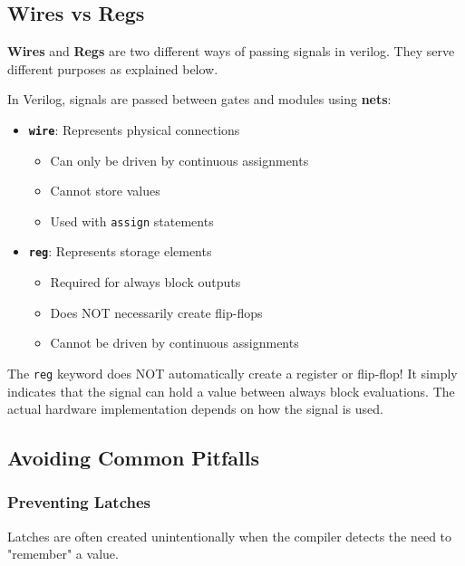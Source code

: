 \documentclass[12pt]{labmanual}
\begin{document}
\subsection{Wires vs Regs}
\textbf{Wires} and \textbf{Regs} are two different ways of passing signals in verilog. They serve different purposes as explained below.
\begin{important}[frametitle={Understanding Nets}]
In Verilog, signals are passed between gates and modules using \textbf{nets}:
\begin{itemize}
    \item \textbf{\texttt{wire}}: Represents physical connections
    \begin{itemize}
        \item Can only be driven by continuous assignments
        \item Cannot store values
        \item Used with \texttt{assign} statements
    \end{itemize}
    \item \textbf{\texttt{reg}}: Represents storage elements
    \begin{itemize}
        \item Required for always block outputs
        \item Does NOT necessarily create flip-flops
        \item Cannot be driven by continuous assignments
    \end{itemize}
\end{itemize}
\end{important}

\begin{extra}[frametitle={Common Misconception}]
The \texttt{reg} keyword does NOT automatically create a register or flip-flop! It simply indicates that the signal can hold a value between always block evaluations. The actual hardware implementation depends on how the signal is used.
\end{extra}

\subsection{Avoiding Common Pitfalls}

\subsubsection{Preventing Latches}

Latches are often created unintentionally when the compiler detects the need to "remember" a value.
\end{document}

